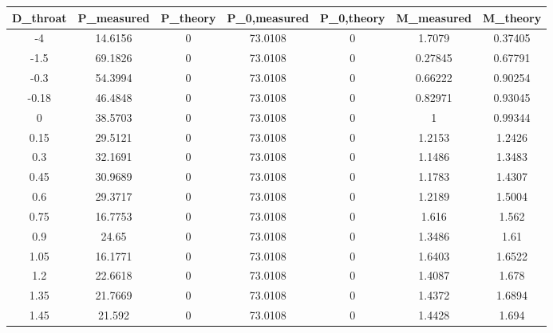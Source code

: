 \begin{tabular}{ccccccc}
\toprule
D_{throat} & P_{measured} & P_{theory} & P_{0,measured} & P_{0,theory} & M_{measured} & M_{theory} \\
\midrule
-4 & 14.6156 & 0 & 73.0108 & 0 & 1.7079 & 0.37405 \\ 
-1.5 & 69.1826 & 0 & 73.0108 & 0 & 0.27845 & 0.67791 \\ 
-0.3 & 54.3994 & 0 & 73.0108 & 0 & 0.66222 & 0.90254 \\ 
-0.18 & 46.4848 & 0 & 73.0108 & 0 & 0.82971 & 0.93045 \\ 
0 & 38.5703 & 0 & 73.0108 & 0 & 1 & 0.99344 \\ 
0.15 & 29.5121 & 0 & 73.0108 & 0 & 1.2153 & 1.2426 \\ 
0.3 & 32.1691 & 0 & 73.0108 & 0 & 1.1486 & 1.3483 \\ 
0.45 & 30.9689 & 0 & 73.0108 & 0 & 1.1783 & 1.4307 \\ 
0.6 & 29.3717 & 0 & 73.0108 & 0 & 1.2189 & 1.5004 \\ 
0.75 & 16.7753 & 0 & 73.0108 & 0 & 1.616 & 1.562 \\ 
0.9 & 24.65 & 0 & 73.0108 & 0 & 1.3486 & 1.61 \\ 
1.05 & 16.1771 & 0 & 73.0108 & 0 & 1.6403 & 1.6522 \\ 
1.2 & 22.6618 & 0 & 73.0108 & 0 & 1.4087 & 1.678 \\ 
1.35 & 21.7669 & 0 & 73.0108 & 0 & 1.4372 & 1.6894 \\ 
1.45 & 21.592 & 0 & 73.0108 & 0 & 1.4428 & 1.694 \\ 
\bottomrule
\end{tabular}